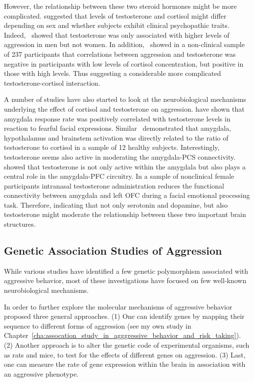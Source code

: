 However, the relationship between these two steroid hormones might be more complicated.
\citet{Rosell2015} suggested that levels of testosterone and cortisol might differ depending on sex and whether subjects exhibit clinical psychopathic traits.
Indeed,~\citet{Kuepper2010} showed that testosterone was only associated with higher levels of aggression in men but not women.
In addition,~\citet{Welker2014} showed in a non-clinical sample of 237 participants that correlations between aggression and testosterone was negative in participants with low levels of cortisol concentration, but positive in those with high levels.
Thus suggesting a considerable more complicated testosterone-cortisol interaction.

A number of studies have also started to look at the neurobiological mechanisms underlying the effect of cortisol and testosterone on aggression.
\citet{Derntl2009} have shown that amygdala response rate was positively correlated with testosterone levels in reaction to fearful facial expressions.
Similar~\citet{Hermans2008} demonstrated that amygdala, hypothalamus and brainstem activation was directly related to the ratio of testosterone to cortisol in a sample of 12 healthy subjects.
Interestingly, testosterone seems also active in moderating the amygdala-PCS connectivity.
\citet{VanWingen2010} showed that testosterone is not only active within the amygdala but also plays a central role in the amygdala-PFC circuitry.
In a sample of nonclinical female participants intranasal testosterone administration reduces the functional connectivity between amygdala and left OFC during a facial emotional processing task.
Therefore, indicating that not only serotonin and dopamine, but also testosterone might moderate the relationship between these two important brain structures.

\subsection{Genetic Association Studies of Aggression}
\label{sec:genetic_associations}

While various studies have identified a few genetic polymorphism associated with aggressive behavior, most of these investigations have focused on few well-known neurobiological mechanisms.

In order to further explore the molecular mechanisms of aggressive behavior~\citet{Maxson2005} proposed three general approaches.
(1) One can identify genes by mapping their sequence to different forms of aggression (see my own study in Chapter~\ref{cha:assocation_study_in_agggressive_behavior_and_risk_taking}).
(2) Another approach is to alter the genetic code of experimental organisms, such as rats and mice, to test for the effects of different genes on aggression.
(3) Last, one can measure the rate of gene expression within the brain in association with an aggressive phenotype.

